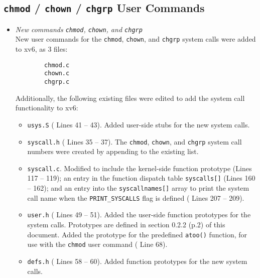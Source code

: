 \documentclass[11pt,letterpaper]{report}
\begin{document}
	\subsection{{\tt chmod} / {\tt chown} / {\tt chgrp} User Commands}
	\begin{itemize}
		\item \emph{New commands {\tt chmod}, {\tt chown}, and {\tt chgrp}}\\
		New user commands for the {\tt chmod}, {\tt chown}, and {\tt chgrp} system calls were added to xv6, as 3 files:
		\begin{verbatim}
		chmod.c
		chown.c
		chgrp.c
		\end{verbatim}
		Additionally, the following existing files were edited to add the system call functionality to xv6:
		\begin{itemize}
			\item {\tt usys.S} ({\color{red} Lines 41 -- 43}). Added user-side stubs for the new system calls.
			\item {\tt syscall.h} ({\color{red} Lines 35 -- 37}). The {\tt chmod}, {\tt chown}, and {\tt chgrp} system call numbers were created by appending to the existing list.
			\item {\tt syscall.c}. Modified to include the kernel-side function prototype ({\color{red}Lines 117 -- 119}); an entry in the function dispatch table {\tt syscalls[]} ({\color{red}Lines 160 -- 162}); and an entry into the {\tt syscallnames[]} array to print the system call name when the {\tt PRINT\_SYSCALLS} flag is defined ({\color{red} Lines 207 -- 209}).
			\item {\tt user.h} ({\color{red} Lines 49 -- 51}). Added the user-side function prototypes for the system calls. Prototypes are defined in section 0.2.2 (p.2) of this document. Added the prototype for the predefined {\tt atoo()} function, for use with the {\tt chmod} user command ({\color{red} Line 68}).
			\item {\tt defs.h} ({\color{red} Lines 58 -- 60}). Added function prototypes for the new system calls. 
		\end{itemize}
		

\end{itemize}
\end{document}
